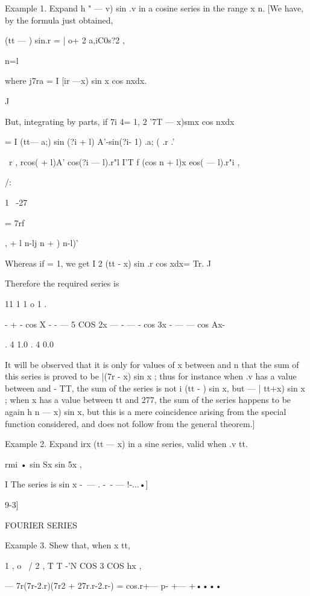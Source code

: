 Example 1. Expand h " — v) sin .v in a cosine series in the range x n.
[We have, by the formula just obtained,

  (tt — ) sin.r = | o+ 2 a,iC0s?2 ,

n=l

where j7ra = I [ir —x) sin x cos nxdx.

J

But, integrating by parts, if 7i 4= 1, 2 '7T — x)smx cos nxdx

= I (tt— a;) sin (?i + l) A'-sin(?i- 1) .a; ( .r .'

\ r , rcos( + l)A' cos(?i — l).r"l I'T f (cos n + l)x eos( — l).r"i ,



/:



1 \ -27

= 7rf



, + l n-lj n + ) n-l)'

Whereas if = 1, we get I 2 (tt - x) sin .r cos xdx= Tr. J

Therefore the required series is

11 1 1 o 1 .

- + - cos X - - — 5 COS 2x — - — - cos 3x - — — cos Ax-

. 4 1.0 . 4 0.0

It will be observed that it is only for values of x between and n that
the sum of this series is proved to be |(7r - x) sin x ; thus for
instance when .v has a value between and - TT, the sum of the series
is not i (tt - ) sin x, but — | tt+x) sin x ; when x has a value
between tt and 277, the sum of the series happens to be again h n — x)
sin x, but this is a mere coincidence arising from the special
function considered, and does not follow from the general theorem.]

Example 2. Expand irx (tt — x) in a sine series, valid when .v tt.

rmi • sin Sx sin 5x ,

I The series is sin x -\ — . -\ - — !-...•]



9-3]



FOURIER SERIES



Example 3. Shew that, when x tt,

1 , o \ / 2 , T T -'N COS 3 COS hx ,

— 7r(7r-2.r)(7r2 + 27r.r-2.r-) = cos.r+— p- +— +••••

